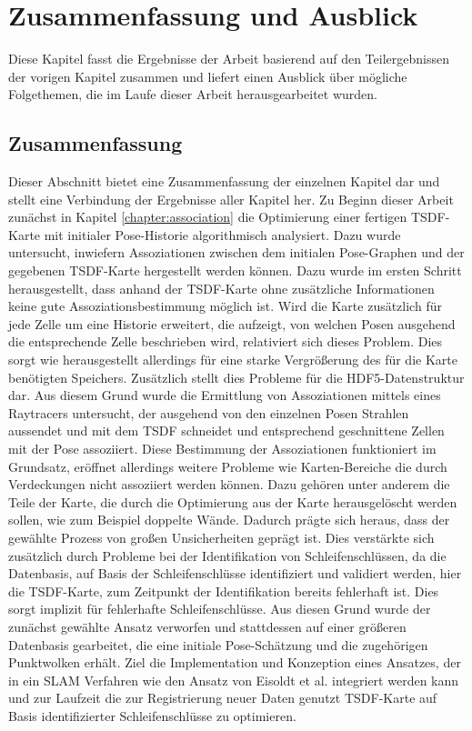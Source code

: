 \chapter{Zusammenfassung und Ausblick}
\label{chapter:ausblick}

Diese Kapitel fasst die Ergebnisse der Arbeit basierend auf den Teilergebnissen der vorigen Kapitel zusammen und liefert einen Ausblick über mögliche Folgethemen, die im Laufe dieser Arbeit herausgearbeitet wurden. 

\section{Zusammenfassung}

Dieser Abschnitt bietet eine Zusammenfassung der einzelnen Kapitel dar und stellt eine Verbindung der Ergebnisse aller Kapitel her. Zu Beginn dieser Arbeit zunächst in Kapitel \ref{chapter:association} die Optimierung einer fertigen TSDF-Karte mit initialer Pose-Historie algorithmisch analysiert. Dazu wurde untersucht, inwiefern Assoziationen zwischen dem initialen Pose-Graphen und der gegebenen TSDF-Karte hergestellt werden können. Dazu wurde im ersten Schritt herausgestellt, dass anhand der TSDF-Karte ohne zusätzliche Informationen keine gute Assoziationsbestimmung möglich ist. Wird die Karte zusätzlich für jede Zelle um eine Historie erweitert, die aufzeigt, von welchen Posen ausgehend die entsprechende Zelle beschrieben wird, relativiert sich dieses Problem. Dies sorgt wie herausgestellt allerdings für eine starke Vergrößerung des für die Karte benötigten Speichers. Zusätzlich stellt dies Probleme für die HDF5-Datenstruktur dar. Aus diesem Grund wurde die Ermittlung von Assoziationen mittels eines Raytracers untersucht, der ausgehend von den einzelnen Posen Strahlen aussendet und mit dem TSDF schneidet und entsprechend geschnittene Zellen mit der Pose assoziiert. Diese Bestimmung der Assoziationen funktioniert im Grundsatz, eröffnet allerdings weitere Probleme wie Karten-Bereiche die durch Verdeckungen nicht assoziiert werden können. Dazu gehören unter anderem die Teile der Karte, die durch die Optimierung aus der Karte herausgelöscht werden sollen, wie zum Beispiel doppelte Wände. Dadurch prägte sich heraus, dass der gewählte Prozess von großen Unsicherheiten geprägt ist. Dies verstärkte sich zusätzlich durch Probleme bei der Identifikation von Schleifenschlüssen, da die Datenbasis, auf Basis der Schleifenschlüsse identifiziert und validiert werden, hier die TSDF-Karte, zum Zeitpunkt der Identifikation bereits fehlerhaft ist. Dies sorgt implizit für fehlerhafte Schleifenschlüsse. Aus diesen Grund wurde der zunächst gewählte Ansatz verworfen und stattdessen auf einer größeren Datenbasis gearbeitet, die eine initiale Pose-Schätzung und die zugehörigen Punktwolken erhält. Ziel die Implementation und Konzeption eines Ansatzes, der in ein SLAM Verfahren wie den Ansatz von Eisoldt et al. \cite{HATSDF} integriert werden kann und zur Laufzeit die zur Registrierung neuer Daten genutzt TSDF-Karte auf Basis identifizierter Schleifenschlüsse zu optimieren. 

